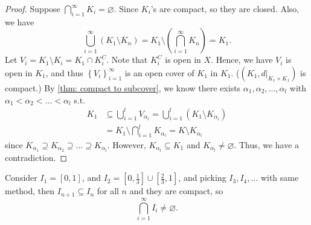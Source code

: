 \begin{proof}
    Suppose \(\bigcap_{i=1}^{\infty} K_i = \varnothing  \). Since \(K_i\)'s are compact, so they are closed. Also, we have 
    \[
        \bigcup_{i=1}^{\infty} \left( K_1 \setminus K_n \right) = K_1 \setminus \left( \bigcap_{i=1}^{\infty} K_n \right) = K_1.
    \]  
    Let \(V_i = K_1 \setminus K_i = K_1 \cap K_i^C\). Note that \(K_i^C\) is open in \(X\). Hence, we have \(V_i\) is open in \(K_1\), and thus \(\left\{ V_i \right\}_{i=1}^{\infty}  \) is an open cover of \(K_1\) in \(K_1\). (\((K_1, d\vert_{K_1 \times K_1})\) is compact.) By \autoref{thm: compact to subcover}, we know there exists \(\alpha _1, \alpha _2, \dots , \alpha _l\) with \(\alpha _1 < \alpha _2 < \dots < \alpha _l\) s.t. 
    \begin{align*}
        K_1 &\subseteq \bigcup_{i=1}^{l} V_{\alpha _i} = \bigcup_{i=1}^{l} \left( K_1 \setminus K_{\alpha _i} \right) \\
            &= K_1 \setminus \bigcap_{i=1}^l K_{\alpha _i} = K \setminus K_{\alpha _l} 
    \end{align*} since \(K_{\alpha _1} \supseteq K_{\alpha _2} \supseteq \dots \supseteq K_{\alpha _l}\). However, \(K_{\alpha _l} \subseteq K_1\) and \(K_{\alpha _l} \neq \varnothing \). Thus, we have a contradiction.  
\end{proof}

\begin{eg}
    Consider \(I_1 = [0, 1]\), and \(I_2 = [0, \frac{1}{3}] \cup [\frac{2}{3}, 1]\), and picking \(I_3, I_4, \dots \) with same method, then \(I_{n+1} \subseteq I_n\) for all \(n\) and they are compact, so
    \[
        \bigcap_{i=1}^{\infty} I_i \neq \varnothing . 
    \]      
\end{eg}

